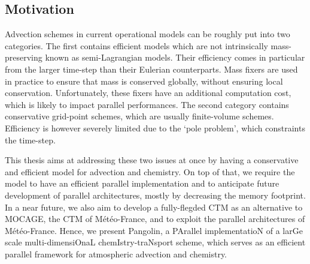 \subsection*{Motivation}
Advection schemes in current operational models can be roughly put into two
categories. The first contains efficient models which are not intrinsically
mass-preserving known as semi-Lagrangian models. Their efficiency comes in
particular from the larger time-step than their Eulerian counterparts.
Mass fixers are used in practice to ensure that mass is conserved globally,
without ensuring local conservation. Unfortunately, these fixers  have an
additional computation cost, which is likely to impact parallel performances.
The second category contains conservative grid-point schemes, which are usually
finite-volume schemes. Efficiency is however severely limited due to the `pole
problem', which constraints the time-step.

This thesis aims at addressing these two issues at once by having a conservative
and efficient model for advection and chemistry. On top of that, we require the
model to have an efficient parallel implementation and to anticipate future
development of parallel architectures, mostly by decreasing the memory
footprint. In a near future, we also aim to develop a fully-flegded CTM as an
alternative to MOCAGE, the CTM of M\'et\'eo-France, and to exploit the parallel
architectures of M\'et\'eo-France. Hence, we present Pangolin, a PArallel
implementatioN of a larGe scale multi-dimensiOnaL chemIstry-traNsport
scheme, which serves as an efficient parallel framework for atmospheric
advection and chemistry.

